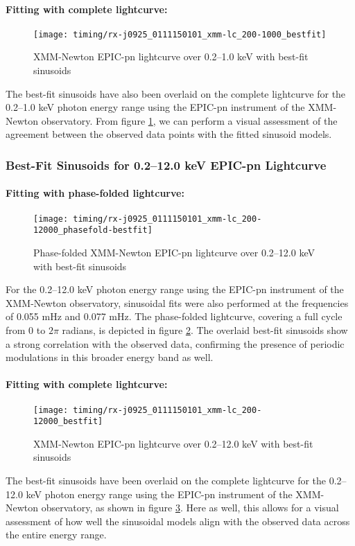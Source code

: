 				\paragraph{Fitting with complete lightcurve:}
				\begin{figure}[h!]
					\centering
					\texttt{[image: timing/rx-j0925\_0111150101\_xmm-lc\_200-1000\_bestfit]}
					\caption{XMM-Newton EPIC-pn lightcurve over 0.2--1.0 keV with best-fit sinusoids}
					\label{result:lc-mrvel-xmm:200-1000-bestfit}
				\end{figure}
				The best-fit sinusoids have also been overlaid on the complete lightcurve for the 0.2--1.0 keV photon energy range using the EPIC-pn instrument of the XMM-Newton observatory. From figure \ref{result:lc-mrvel-xmm:200-1000-bestfit}, we can perform a visual assessment of the agreement between the observed data points with the fitted sinusoid models.
				
			\subsubsection{Best-Fit Sinusoids for 0.2--12.0 keV EPIC-pn Lightcurve}
				\paragraph{Fitting with phase-folded lightcurve:}
				\begin{figure}[h!]
					\centering
					\texttt{[image: timing/rx-j0925\_0111150101\_xmm-lc\_200-12000\_phasefold-bestfit]}
					\caption{Phase-folded XMM-Newton EPIC-pn lightcurve over 0.2--12.0 keV with best-fit sinusoids}
					\label{result:lc-phase-fold-mrvel-xmm:200-12000-bestfit}
				\end{figure}
				For the 0.2--12.0 keV photon energy range using the EPIC-pn instrument of the XMM-Newton observatory, sinusoidal fits were also performed at the frequencies of 0.055 mHz and 0.077 mHz. The phase-folded lightcurve, covering a full cycle from 0 to $2\pi$ radians, is depicted in figure \ref{result:lc-phase-fold-mrvel-xmm:200-12000-bestfit}. The overlaid best-fit sinusoids show a strong correlation with the observed data, confirming the presence of periodic modulations in this broader energy band as well.
				
				\paragraph{Fitting with complete lightcurve:}
				\begin{figure}[h!]
					\centering
					\texttt{[image: timing/rx-j0925\_0111150101\_xmm-lc\_200-12000\_bestfit]}
					\caption{XMM-Newton EPIC-pn lightcurve over 0.2--12.0 keV with best-fit sinusoids}
					\label{result:lc-mrvel-xmm:200-12000-bestfit}
				\end{figure}
				The best-fit sinusoids have been overlaid on the complete lightcurve for the 0.2--12.0 keV photon energy range using the EPIC-pn instrument of the XMM-Newton observatory, as shown in figure \ref{result:lc-mrvel-xmm:200-12000-bestfit}. Here as well, this allows for a visual assessment of how well the sinusoidal models align with the observed data across the entire energy range.
			
